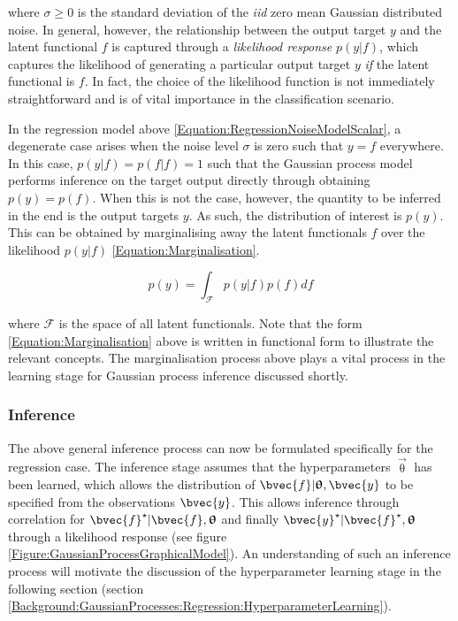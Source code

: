 				where $\sigma \geq 0$ is the standard deviation of the \textit{iid} zero mean Gaussian distributed noise. In general, however, the relationship between the output target $y$ and the latent functional $f$ is captured through a \textit{likelihood response} $p(y | f)$, which captures the likelihood of generating a particular output target $y$ \textit{if} the latent functional is $f$. In fact, the choice of the likelihood function is not immediately straightforward and is of vital importance in the classification scenario. 
				
				In the regression model above \eqref{Equation:RegressionNoiseModelScalar}, a degenerate case arises when the noise level $\sigma$ is zero such that $y = f$ everywhere. In this case, $p(y | f) = p(f | f) = 1$ such that the Gaussian process model performs inference on the target output directly through obtaining $p (y) = p(f)$. When this is not the case, however, the quantity to be inferred in the end is the output targets $y$. As such, the distribution of interest is $p(y)$. This can be obtained by marginalising away the latent functionals $f$ over the likelihood $p(y | f)$ \eqref{Equation:Marginalisation}.
				
				\begin{equation}
					p(y) = \int_{\mathscr{F}} p(y | f) p(f) df
				\label{Equation:Marginalisation}
				\end{equation}
				
				where $\mathscr{F}$ is the space of all latent functionals. Note that the form \eqref{Equation:Marginalisation} above is written in functional form to illustrate the relevant concepts. The marginalisation process above plays a vital process in the learning stage for Gaussian process inference discussed shortly.
		
			\subsubsection{Inference}
			\label{Background:GaussianProcesses:Regression:Inference}
			
				The above general inference process can now be formulated specifically for the regression case. The inference stage assumes that the hyperparameters $\vec{\uptheta}$ has been learned, which allows the distribution of $\bvec{f} | \vec{\uptheta}, \bvec{y}$ to be specified from the observations $\bvec{y}$. This allows inference through correlation for $\bvec{f}^{\star} | \bvec{f}, \vec{\uptheta}$ and finally $\bvec{y}^{\star} | \bvec{f}^{\star}, \vec{\uptheta}$ through a likelihood response (see figure \ref{Figure:GaussianProcessGraphicalModel}). An understanding of such an inference process will motivate the discussion of the hyperparameter learning stage in the following section (section \ref{Background:GaussianProcesses:Regression:HyperparameterLearning}).
				
